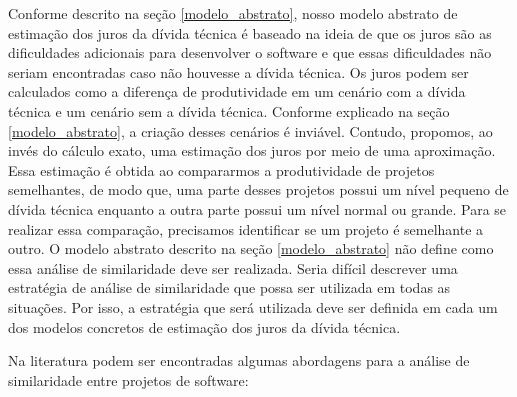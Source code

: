 Conforme descrito na seção \ref{modelo_abstrato}, nosso modelo abstrato de estimação dos juros da dívida técnica é baseado na ideia de que os juros são as dificuldades adicionais para desenvolver o software e que essas dificuldades não seriam encontradas caso não houvesse a dívida técnica. Os juros podem ser calculados como a diferença de produtividade em um cenário com a dívida técnica e um cenário sem a dívida técnica. Conforme explicado na seção \ref{modelo_abstrato}, a criação desses cenários é inviável. Contudo, propomos, ao invés do cálculo exato, uma estimação dos juros por meio de uma aproximação. Essa estimação é obtida ao compararmos a produtividade de projetos semelhantes, de modo que, uma parte desses projetos possui um nível pequeno de dívida técnica enquanto a outra parte possui um nível normal ou grande.  Para se realizar essa comparação, precisamos identificar se um projeto é semelhante a outro. O modelo abstrato descrito na seção \ref{modelo_abstrato} não define como essa análise de similaridade deve ser realizada. Seria difícil descrever uma estratégia de análise de similaridade que possa ser utilizada em todas as situações. Por isso, a estratégia que será utilizada deve ser definida em cada um dos modelos concretos de estimação dos juros da dívida técnica.


Na literatura podem ser encontradas algumas abordagens para a análise de similaridade entre projetos de software:
 
